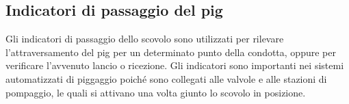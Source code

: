 \subsection{Indicatori di passaggio del pig}
Gli indicatori di passaggio dello scovolo sono utilizzati per rilevare l'attraversamento del pig per un determinato punto della condotta, oppure per verificare l'avvenuto lancio o ricezione. Gli indicatori sono importanti nei sistemi automatizzati di piggaggio poiché sono collegati alle valvole e alle stazioni di pompaggio, le quali si attivano una volta giunto lo scovolo in posizione.

\begin{figure}[htbp]
    \centering
    \qquad
    \\

\end{figure}
